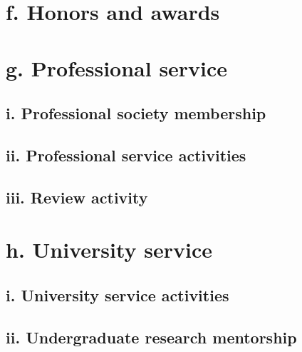\documentclass{article}
\begin{document}




\section*{f. Honors and awards}




\section*{g. Professional service}

\subsection*{i. Professional society membership}



\subsection*{ii. Professional service activities}



\subsection*{iii. Review activity}




\section*{h. University service}

\subsection*{i. University service activities}



\subsection*{ii. Undergraduate research mentorship}


\end{document}

